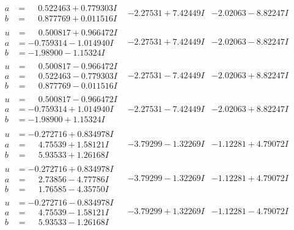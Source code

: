 \documentclass[1p]{elsarticle_modified}
\theoremstyle{definition}
\begin{document}
$$\begin{array}{c|c|c}
\begin{aligned}
a &= \phantom{-}0.522463 + 0.779303 I \\
b &= \phantom{-}0.877769 + 0.011516 I\end{aligned}
 & -2.27531 + 7.42449 I & -2.02063 - 8.82247 I \\ \hline\begin{aligned}
u &= \phantom{-}0.500817 + 0.966472 I \\
a &= -0.759314 - 1.014940 I \\
b &= -1.98900 - 1.15324 I\end{aligned}
 & -2.27531 + 7.42449 I & -2.02063 - 8.82247 I \\ \hline\begin{aligned}
u &= \phantom{-}0.500817 - 0.966472 I \\
a &= \phantom{-}0.522463 - 0.779303 I \\
b &= \phantom{-}0.877769 - 0.011516 I\end{aligned}
 & -2.27531 - 7.42449 I & -2.02063 + 8.82247 I \\ \hline\begin{aligned}
u &= \phantom{-}0.500817 - 0.966472 I \\
a &= -0.759314 + 1.014940 I \\
b &= -1.98900 + 1.15324 I\end{aligned}
 & -2.27531 - 7.42449 I & -2.02063 + 8.82247 I \\ \hline\begin{aligned}
u &= -0.272716 + 0.834978 I \\
a &= \phantom{-}4.75539 + 1.58121 I \\
b &= \phantom{-}5.93533 + 1.26168 I\end{aligned}
 & -3.79299 - 1.32269 I & -1.12281 + 4.79072 I \\ \hline\begin{aligned}
u &= -0.272716 + 0.834978 I \\
a &= \phantom{-}2.73856 - 4.77786 I \\
b &= \phantom{-}1.76585 - 4.35750 I\end{aligned}
 & -3.79299 - 1.32269 I & -1.12281 + 4.79072 I \\ \hline\begin{aligned}
u &= -0.272716 - 0.834978 I \\
a &= \phantom{-}4.75539 - 1.58121 I \\
b &= \phantom{-}5.93533 - 1.26168 I\end{aligned}
 & -3.79299 + 1.32269 I & -1.12281 - 4.79072 I \\ \hline\begin{aligned}

\end{aligned}
\end{array}$$
\end{document}
